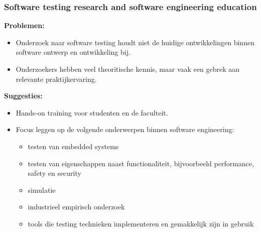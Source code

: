 \documentclass[10pt]{beamer}
\begin{document}
    \begin{frame}
        \frametitle{Software testing research and software engineering education}
        \textbf{Problemen:}
        \begin{itemize}
            \item Onderzoek naar software testing houdt niet de huidige ontwikkelingen binnen software ontwerp en ontwikkeling bij.
            \item Onderzoekers hebben veel theoritische kennis, maar vaak een gebrek aan relevante praktijkervaring.
        \end{itemize}
        
        \textbf{Suggesties:}
        \begin{itemize}
            \item Hands-on training voor studenten en de faculteit.
            \item Focus leggen op de volgende onderwerpen binnen software engineering:
            \begin{itemize}
                \item testen van embedded systems
                \item testen van eigenschappen naast functionaliteit, bijvoorbeeld
                performance, safety en security
                \item simulatie
                \item industrieel empirisch onderzoek
                \item tools die testing technieken implementeren en gemakkelijk zijn in gebruik
            \end{itemize}
        \end{itemize}
    \end{frame}
\end{document}
